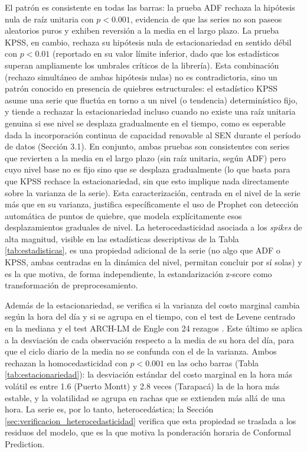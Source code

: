 El patrón es consistente en todas las barras: la prueba ADF rechaza la hipótesis nula de raíz unitaria con $p < 0.001$, evidencia de que las series no son paseos aleatorios puros y exhiben reversión a la media en el largo plazo. La prueba KPSS, en cambio, rechaza su hipótesis nula de estacionariedad en sentido débil con $p < 0.01$ (reportado en su valor límite inferior, dado que los estadísticos superan ampliamente los umbrales críticos de la librería). Esta combinación (rechazo simultáneo de ambas hipótesis nulas) no es contradictoria, sino un patrón conocido en presencia de quiebres estructurales: el estadístico KPSS asume una serie que fluctúa en torno a un nivel (o tendencia) determinístico fijo, y tiende a rechazar la estacionariedad incluso cuando no existe una raíz unitaria genuina si ese nivel se desplaza gradualmente en el tiempo, como es esperable dada la incorporación continua de capacidad renovable al SEN durante el período de datos (Sección 3.1). En conjunto, ambas pruebas son consistentes con series que revierten a la media en el largo plazo (sin raíz unitaria, según ADF) pero cuyo nivel base no es fijo sino que se desplaza gradualmente (lo que basta para que KPSS rechace la estacionariedad, sin que esto implique nada directamente sobre la varianza de la serie). Esta caracterización, centrada en el nivel de la serie más que en su varianza, justifica específicamente el uso de Prophet con detección automática de puntos de quiebre, que modela explícitamente esos desplazamientos graduales de nivel. La heterocedasticidad asociada a los \textit{spikes} de alta magnitud, visible en las estadísticas descriptivas de la Tabla \ref{tab:estadisticas}, es una propiedad adicional de la serie (no algo que ADF o KPSS, ambas centradas en la dinámica del nivel, permitan concluir por sí solas) y es la que motiva, de forma independiente, la estandarización z-score como transformación de preprocesamiento.

Además de la estacionariedad, se verifica si la varianza del costo marginal cambia según la hora del día y si se agrupa en el tiempo, con el test de Levene centrado en la mediana \cite{Levene1960, BrownForsythe1974} y el test ARCH-LM de Engle con 24 rezagos \cite{Engle1982}. Este último se aplica a la desviación de cada observación respecto a la media de su hora del día, para que el ciclo diario de la media no se confunda con el de la varianza. Ambos rechazan la homocedasticidad con $p < 0.001$ en las ocho barras (Tabla \ref{tab:estacionariedad}): la desviación estándar del costo marginal en la hora más volátil es entre 1.6 (Puerto Montt) y 2.8 veces (Tarapacá) la de la hora más estable, y la volatilidad se agrupa en rachas que se extienden más allá de una hora. La serie es, por lo tanto, heterocedástica; la Sección \ref{sec:verificacion_heterocedasticidad} verifica que esta propiedad se traslada a los residuos del modelo, que es la que motiva la ponderación horaria de Conformal Prediction.

